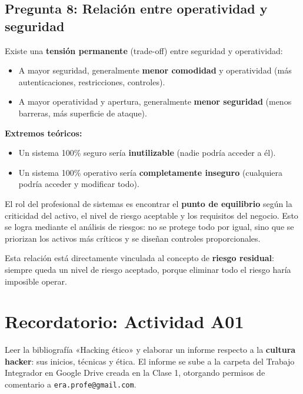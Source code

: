 \documentclass[11pt,a4paper]{article}
\begin{document}
\subsection*{Pregunta 8: Relación entre operatividad y seguridad}
\begin{respuesta}
Existe una \textbf{tensión permanente} (trade-off) entre seguridad y operatividad:

\begin{itemize}[leftmargin=*]
  \item A mayor seguridad, generalmente \textbf{menor comodidad} y operatividad (más autenticaciones, restricciones, controles).
  \item A mayor operatividad y apertura, generalmente \textbf{menor seguridad} (menos barreras, más superficie de ataque).
\end{itemize}

\textbf{Extremos teóricos:}
\begin{itemize}[leftmargin=*]
  \item Un sistema 100\% seguro sería \textbf{inutilizable} (nadie podría acceder a él).
  \item Un sistema 100\% operativo sería \textbf{completamente inseguro} (cualquiera podría acceder y modificar todo).
\end{itemize}

El rol del profesional de sistemas es encontrar el \textbf{punto de equilibrio} según la criticidad del activo, el nivel de riesgo aceptable y los requisitos del negocio. Esto se logra mediante el análisis de riesgos: no se protege todo por igual, sino que se priorizan los activos más críticos y se diseñan controles proporcionales.

Esta relación está directamente vinculada al concepto de \textbf{riesgo residual}: siempre queda un nivel de riesgo aceptado, porque eliminar todo el riesgo haría imposible operar.
\end{respuesta}

\section{Recordatorio: Actividad A01}
\begin{clave}
Leer la bibliografía «Hacking ético» y elaborar un informe respecto a la \textbf{cultura hacker}: sus inicios, técnicas y ética. El informe se sube a la carpeta del Trabajo Integrador en Google Drive creada en la Clase 1, otorgando permisos de comentario a \texttt{era.profe@gmail.com}.
\end{clave}
\end{document}
